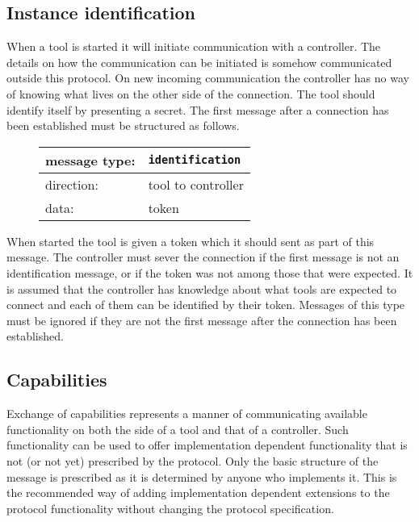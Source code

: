 \documentclass{article}
\newcommand{\msg}[1]{\texttt{#1}}
\begin{document}
  \subsection{Instance identification}

   When a tool is started it will initiate communication with a controller.
   The details on how the communication can be initiated is somehow
   communicated outside this protocol. On new incoming communication the
   controller has no way of knowing what lives on the other side of the
   connection. The tool should identify itself by presenting a secret. The
   first message after a connection has been established must be structured as
   follows.
   
   \begin{figure}[H]
    \begin{center}
     \begin{tabular}{|ll|}
      \hline
      message type:    & \msg{identification} \\
      \hline
      direction:       & tool to controller \\
      data:            & token \\
      \hline
     \end{tabular}
    \end{center}
   \end{figure}

   \noindent When started the tool is given a token which it should sent as
   part of this message. The controller must sever the connection if the first
   message is not an identification message, or if the token was not among
   those that were expected. It is assumed that the controller has knowledge
   about what tools are expected to connect and each of them can be identified
   by their token.  Messages of this type must be ignored if they are not the
   first message after the connection has been established.

  \subsection{Capabilities}

   Exchange of capabilities represents a manner of communicating available
   functionality on both the side of a tool and that of a controller.  Such
   functionality can be used to offer implementation dependent functionality
   that is not (or not yet) prescribed by the protocol. Only the basic
   structure of the message is prescribed as it is determined by anyone who
   implements it. This is the recommended way of adding implementation
   dependent extensions to the protocol functionality without changing the
   protocol specification.
\end{document}
